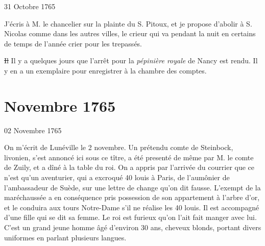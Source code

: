                      \begin{diary}{31 Octobre 1765}{}
                        
                         J'écris à M. le chancelier sur la plainte
                           du S. Pitoux, et je propose
                           d'abolir à S.
                              Nicolas comme dans les autres villes, le
                           crieur qui va pendant la
                           nuit en certains
                           de temps de l'année crier pour les trepassés. \bigskip
        
        
                        
                           \sout{Il} Il y a quelques jours que l'arrêt pour
                              la
                              \emph{pépinière royale} de Nancy est rendu. Il y
                           en a un exemplaire pour enregistrer à la
                              chambre des comptes. \bigskip
        
        
                     \end{diary}
                  \chapter*{Novembre 1765}
                     
                     
                     

                     \begin{diary}{02 Novembre 1765}{}
                        
                         On m'écrit de Lunéville le 2 novembre.
                           Un prétendu comte de
                              Steinbock, livonien,
                           s'est annoncé ici sous ce tître, a été presenté
                           de même par M. le comte de
                              Zuily, et a dîné
                           à la table du roi. On a appris par l'arrivée
                           du courrier que ce n'est qu'un aventurier,
                           qui a excroqué 40 louis à Paris,
                           de l'aumônier
                              de l'ambassadeur de Suède, sur une lettre de
                           change qu'on dit fausse. L'exempt de la maréchaussée
                           a en conséquence pris possession de son
                           appartement à l'arbre d'or, et le conduira
                           aux tours Notre-Dame s'il ne réalise les 40 louis.
                           Il est accompagné d'une fille qui se dit sa femme.
                           Le roi est furieux qu'on
                           l'ait fait manger
                           avec lui. C'est un grand jeune homme âgé
                           d'environ 30 ans, cheveux blonds, portant
                           divers uniformes en parlant plusieurs langues. \bigskip
        
        
                     \end{diary}

